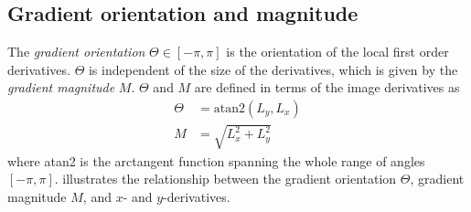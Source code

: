 \documentclass[thesis.tex]{subfiles}
\begin{document}
\subsection{Gradient orientation and magnitude}
\label{sec:gradientTheory}
%
The \emph{gradient orientation} $\Theta \in [-\pi,\pi]$ is the orientation of the local first order derivatives. $\Theta$ is independent of the size of the derivatives, which is given by the \emph{gradient magnitude} $M$. $\Theta$ and $M$ are defined in terms of the image derivatives as
%
\begin{align*}
\Theta &= \text{atan2}(L_y,L_x) \\
M &= \sqrt{L_x^2 + L_y^2}
\end{align*}
where atan2 is the arctangent function spanning the whole range of angles $[-\pi,\pi]$.
%
 illustrates the relationship between the gradient orientation $\Theta$, gradient magnitude $M$, and $x$- and $y$-derivatives.
%
\end{document}
